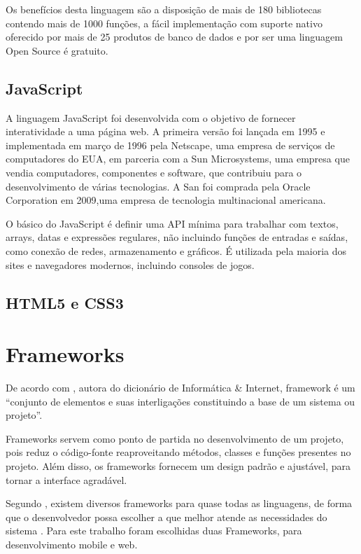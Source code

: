 Os benefícios desta linguagem são a disposição de mais de 180 bibliotecas contendo mais de 1000 funções, a fácil implementação com suporte nativo oferecido por mais de 25 produtos de banco de dados e por ser uma linguagem Open Source é gratuito.


\subsection{JavaScript}

A linguagem JavaScript foi desenvolvida com o objetivo de fornecer interatividade a uma página web. A primeira versão foi lançada em 1995 e implementada em março de 1996 pela Netscape, uma empresa de serviços de computadores do EUA, em parceria com a Sun Microsystems, uma empresa que vendia computadores, componentes e software, que contribuiu para o desenvolvimento de várias tecnologias. A San foi comprada pela Oracle Corporation em 2009,uma empresa de tecnologia multinacional americana.

O básico do JavaScript é definir uma API mínima para trabalhar com textos, arrays, datas e expressões regulares, não incluindo funções de entradas e saídas, como conexão de redes, armazenamento e gráficos. É utilizada pela maioria dos sites e navegadores modernos, incluindo consoles de jogos.\cite{flanagan2004javascript}

\subsection{HTML5 e CSS3}



\section{Frameworks}

De acordo com , autora do dicionário de Informática \& Internet, framework é um “conjunto de elementos e suas interligações constituindo a base de um sistema ou projeto”.

Frameworks servem como ponto de partida no desenvolvimento de um projeto, pois reduz o código-fonte reaproveitando métodos, classes e funções presentes no projeto. Além disso, os frameworks fornecem um design padrão e ajustável, para tornar a interface agradável.\cite{gabardo2017laravel}

Segundo , existem diversos frameworks para quase todas as linguagens, de forma que o desenvolvedor possa escolher a que melhor atende as necessidades do sistema . Para este trabalho foram escolhidas duas Frameworks, para desenvolvimento mobile e web.

